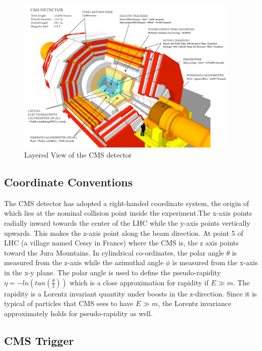 \begin{figure}
\begin{center}
  \includegraphics[width=0.95\textwidth,keepaspectratio]{plots_and_figures/chapter3/cms_layered.png}
\caption{Layered View of the CMS detector}
\label{fig:cms_layered}
\end{center}
\end{figure}




\subsection{Coordinate Conventions}
\label{cor_conv}
The CMS detector has adopted a right-handed coordinate system, the origin of which lies at the nominal collision point inside the experiment.The x-axis points radially inward towards the center of the LHC while the y-axis points vertically upwards. This makes the z-axis point along the beam direction. At point 5 of LHC (a village named Cessy in France) where the CMS is, the z axis points toward the Jura Mountains. In cylindrical co-ordinates, the polar angle $\theta$ is measured from the z-axis while the azimuthal angle $\phi$ is measured from the x-axis in the x-y plane. The polar angle is used to define the pseudo-rapidity $\eta =-ln(tan(\frac{\theta}{2}))$ which is a close approximation for rapidity if $E\gg m$. The rapidity is a Lorentz invariant quantity under boosts in the z-direction. Since it is typical of particles that CMS sees to have $E\gg m$, the Lorentz invariance approximately holds for pseudo-rapidity as well. 

\subsection{CMS Trigger}
\label{trigger}

